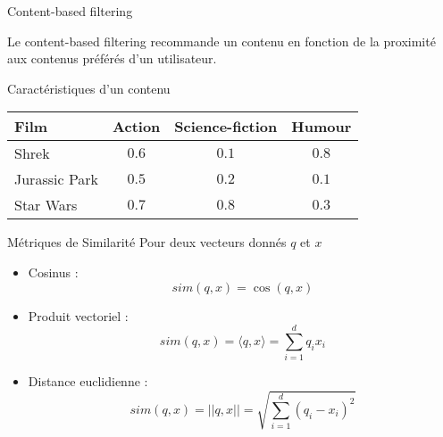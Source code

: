 \begin{frame}{Content-based filtering}
  \begin{minipage}{0.49\linewidth}
    Le \alert{content-based filtering} recommande un contenu en fonction de la proximité aux contenus préférés d'un utilisateur.
  \end{minipage}
  \begin{minipage}{0.49\linewidth}
  \end{minipage}
\end{frame}

\begin{frame}{Caractéristiques d'un contenu}
  \centering
  \begin{tabular}{|l|c|c|c|}
    \toprule
    Film & Action & Science-fiction & Humour\\
    \midrule
    Shrek & $0.6$ & $0.1$ & $0.8$\\
    \midrule
    Jurassic Park & $0.5$ & $0.2$ & $0.1$\\
    \midrule
    Star Wars & $0.7$ & $0.8$ & $0.3$\\
    \bottomrule
  \end{tabular}
\end{frame}

\begin{frame}{Métriques de Similarité}
  Pour deux  vecteurs donnés $q$ et $x$
  \begin{itemize}
    \item Cosinus : 
     $$sim(q,x) = \cos(q,x)$$
    \item Produit vectoriel :
     $$sim(q,x) = \langle q,x\rangle = \sum^d_{i=1}q_i x_i$$
    \item Distance euclidienne :
     $$sim(q,x) = ||q,x|| = \sqrt{\sum^d_{i=1}(q_i-x_i)^2}$$
  \end{itemize}
\end{frame}

